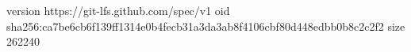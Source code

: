 version https://git-lfs.github.com/spec/v1
oid sha256:ca7be6cb6f139ff1314e0b4fecb31a3da3ab8f4106cbf80d448edbb0b8c2c2f2
size 262240
